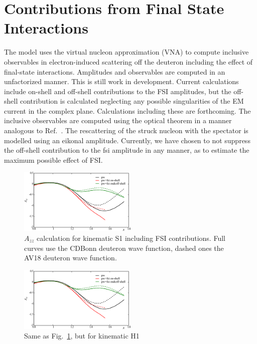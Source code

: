 
\section{Contributions from Final State Interactions}

The model uses the virtual nucleon approximation (VNA) to compute inclusive 
observables in electron-induced scattering off the deuteron including the 
effect of final-state interactions.  Amplitudes and observables are computed in 
an unfactorized manner.  This is still work in development.  Current 
calculations include on-shell and off-shell contributions to the FSI 
amplitudes, but the off-shell contribution is calculated neglecting any 
possible singularities of the EM current in the complex plane.  Calculations 
including these are forthcoming.  The inclusive observables are computed using 
the optical theorem in a manner analogous to Ref.~\cite{Cosyn:2013uoa}.  The 
rescattering of the struck nucleon with the spectator is modelled using an 
eikonal amplitude.  Currently, we have chosen to not suppress the off-shell 
contribution to the fsi amplitude in any manner, as to estimate the maximum 
possible effect of FSI.

\begin{figure}[htb]
\begin{center}
  \includegraphics[width=0.5\textwidth]{figs/kin1_cdbonn_av18.eps}
\caption{$A_{zz}$ calculation for kinematic S1 including FSI contributions.  
Full curves use the CDBonn deuteron wave function, dashed ones the AV18 
deuteron wave function.}
\label{fig:kin1}       %
\end{center}
\end{figure}

\begin{figure}[htb]
\begin{center}
  \includegraphics[width=0.5\textwidth]{figs/kin1_cdbonn_av18.eps}
\caption{Same as Fig.~\ref{fig:kin1}, but for kinematic H1}
\label{fig:kin2}       %
\end{center}
\end{figure}

